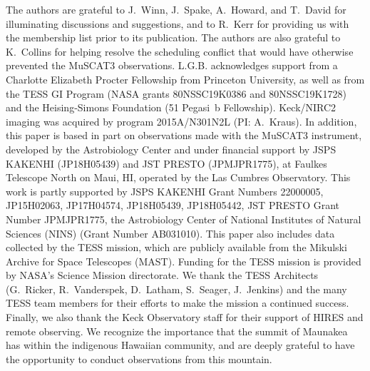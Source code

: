 \documentclass[12pt,modern,twocolumn,tighten]{aastex63}
\begin{document}


\acknowledgements
\raggedbottom

The authors are grateful to J{.}~Winn, J{.}~Spake, A{.}~Howard, and
T{.}~David for illuminating discussions and suggestions, and to
R{.}~Kerr for providing us with the \citet{Kerr2021} membership list
prior to its publication.  The authors are also grateful to
K{.}~Collins for helping resolve the scheduling conflict that would
have otherwise prevented the MuSCAT3 observations.
%
L.G.B{.} acknowledges support from a Charlotte Elizabeth Procter
Fellowship from Princeton University, as well as from the TESS GI
Program (NASA grants 80NSSC19K0386 and 80NSSC19K1728) and the
Heising-Simons Foundation (51 Pegasi~b Fellowship).
%
%
Keck/NIRC2 imaging was acquired by program 2015A/N301N2L
(PI: A.~Kraus). %
%
In addition, this paper is based in part on observations made with the
MuSCAT3 instrument, developed by the Astrobiology Center and under
financial support by JSPS KAKENHI (JP18H05439) and JST PRESTO
(JPMJPR1775), at Faulkes Telescope North on Maui, HI, operated by the
Las Cumbres Observatory.
%
This work is partly supported by JSPS KAKENHI Grant Numbers 22000005,
JP15H02063, JP17H04574, JP18H05439, JP18H05442, JST PRESTO Grant
Number JPMJPR1775, the Astrobiology Center of National Institutes of
Natural Sciences (NINS) (Grant Number AB031010).
%
%
This paper also includes data collected by the TESS mission, which are
publicly available from the Mikulski Archive for Space Telescopes
(MAST).
%
Funding for the TESS mission is provided by NASA's Science Mission
directorate.
%
We thank the TESS Architects (G.~Ricker, R.~Vanderspek, D.~Latham,
S.~Seager, J.~Jenkins) and the many TESS team members for their
efforts to make the mission a continued success.
%
%
%
%
Finally, we also thank the Keck
Observatory staff for their support of HIRES and remote observing.  We
recognize the importance that the summit of Maunakea has within the
indigenous Hawaiian community, and are deeply grateful to have the
opportunity to conduct observations from this mountain.
%
%
\end{document}
